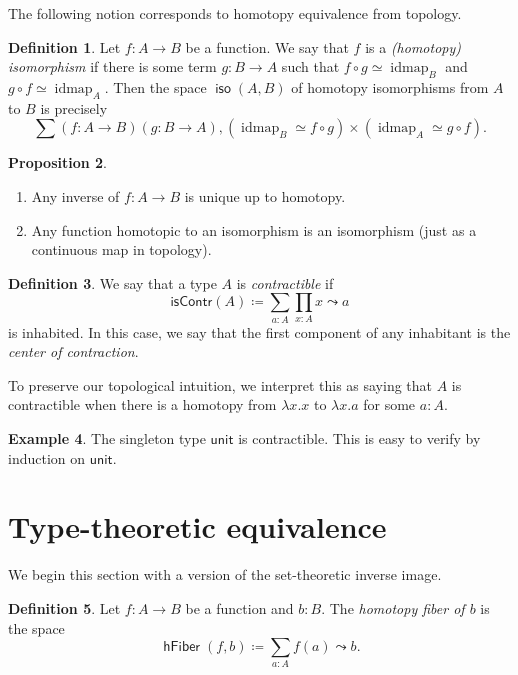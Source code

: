 \documentclass[10pt,letterpaper,cm]{nupset}
\theoremstyle{definition}
\newtheorem{definition}{Definition}[subsection]
\newtheorem{exmp}[definition]{Example}
\theoremstyle{theorem}
\newtheorem{prop}[definition]{Proposition}
\theoremstyle{remark}
\newcommand{\1}{\mathbf{1}}
\newcommand{\0}{\vec 0}
\DeclareMathOperator{\idmap}{idmap}
\DeclareMathOperator{\iso}{\mathsf{iso}}
\DeclareMathOperator{\hfiber}{\mathsf{hFiber}}
\begin{document}
The following notion corresponds to homotopy equivalence from topology.

\begin{definition}
Let $f: A \to B$ be a function. We say that $f$ is a \textit{(homotopy) isomorphism} if there is some term $g:  B \to A$ such that $f \circ g \simeq \idmap_B$ and $g\circ f \simeq \idmap_A$. Then the space $\iso(A,B)$ of homotopy isomorphisms from $A$ to $B$ is precisely $$\sum(f:A\to B)(g:B \to A), \left(\idmap_B \simeq f\circ g\right) \times  \left(\idmap_A \simeq g\circ f\right).$$
\end{definition}

\begin{prop} $ $
\begin{enumerate}
\item Any inverse of $f: A \to B$ is unique up to homotopy. 
\item  Any function homotopic to an isomorphism is an isomorphism (just as a continuous map in topology).
\end{enumerate}
\end{prop}

\begin{definition}
We say that a type $A$ is \textit{contractible} if 
\[
\mathsf{isContr}(A)\coloneqq \sum_{a:A}\prod_{x:A}x \leadsto a
\] is inhabited. In this case, we say that the first component of any inhabitant is the \textit{center of contraction}.
\end{definition}


To preserve our topological intuition, we interpret this as saying that $A$ is contractible when there is a homotopy from $\lambda x.x$ to $\lambda x.a$ for some $a:A$.


\begin{exmp}
The singleton type  $\mathsf{unit}$ is contractible. This is easy to verify by induction on $\mathsf{unit}$.
\end{exmp}

\section{Type-theoretic equivalence}

We begin this section with a version of the set-theoretic inverse image.

\begin{definition}
Let $f: A \to B$ be a function and $b: B$. The \textit{homotopy fiber of $b$} is the space $$\hfiber(f,b) \coloneqq \sum_{a:A}f(a) \leadsto b .$$
\end{definition}
\end{document}

